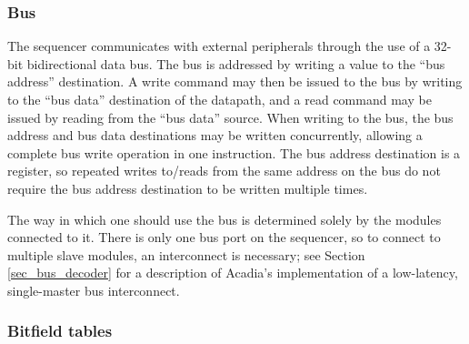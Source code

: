 \subsubsection{Bus}

The sequencer communicates with external peripherals through the use of a 32-bit bidirectional data bus. The bus is addressed by writing a value to the ``bus address'' destination. A write command may then be issued to the bus by writing to the ``bus data'' destination of the datapath, and a read command may be issued by reading from the ``bus data'' source. When writing to the bus, the bus address and bus data destinations may be written concurrently, allowing a complete bus write operation in one instruction. The bus address destination is a register, so repeated writes to/reads from the same address on the bus do not require the bus address destination to be written multiple times.

The way in which one should use the bus is determined solely by the modules connected to it. There is only one bus port on the sequencer, so to connect to multiple slave modules, an interconnect is necessary; see Section \ref{sec_bus_decoder} for a description of Acadia's implementation of a low-latency, single-master bus interconnect.

\subsubsection{Bitfield tables}

